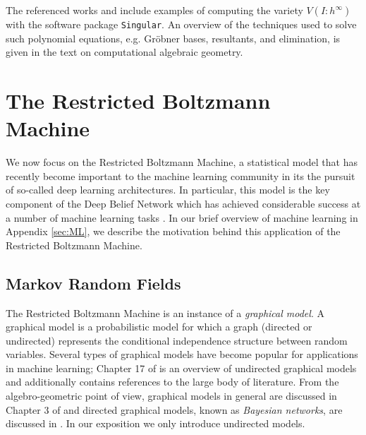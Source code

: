 \documentclass[11pt,titlepage]{article}
\numberwithin{equation}{section}
\begin{document}
    The referenced works \cite{ASCB} and \cite{DSS08} include examples of
    computing the variety $V(I : h^\infty)$ with the software package
    \texttt{Singular}.  An overview of the techniques used to solve such
    polynomial equations, e.g. Gröbner bases, resultants, and elimination, is
    given in the text \cite{CLO05} on computational algebraic geometry.
% 






\section{The Restricted Boltzmann Machine}

    We now focus on the Restricted Boltzmann Machine, a statistical model that
    has recently become important to the machine learning community in its the
    pursuit of so-called deep learning architectures.  In particular, this
    model is the key component of the Deep Belief Network which has achieved
    considerable success at a number of machine learning tasks \cite{Hin07}.  In
    our brief overview of machine learning in Appendix \ref{sec:ML}, we describe
    the motivation behind this application of the Restricted Boltzmann Machine.

\subsection{Markov Random Fields}
    \label{sec:rbm-def}

    The Restricted Boltzmann Machine is an instance of a \emph{graphical model}.
    A graphical model is a probabilistic model for which a graph (directed or
    undirected) represents the conditional independence structure between random
    variables.  Several types of graphical models have become popular for
    applications in machine learning; Chapter 17 of \cite{EOSL} is an overview
    of undirected graphical models and additionally contains references to the
    large body of literature.  From the algebro-geometric point of view,
    graphical models in general are discussed in Chapter 3 of \cite{DSS08} and
    directed graphical models, known as \emph{Bayesian networks}, are discussed
    in \cite{GSS}.  In our exposition we only introduce undirected models.
\end{document}
